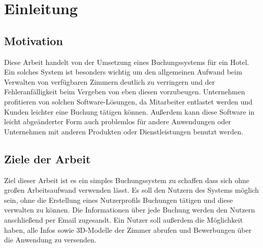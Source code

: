 \chapter{Einleitung}
\section{Motivation}
Diese Arbeit handelt von der Umsetzung eines Buchungssystems für ein Hotel. Ein solches System ist besonders wichtig um den allgemeinen Aufwand beim Verwalten von verfügbaren Zimmern deutlich zu verringern und der Fehleranfälligkeit beim Vergeben von eben diesen vorzubeugen. Unternehmen profitieren von solchen Software-Lösungen, da Mitarbeiter entlastet werden und Kunden leichter eine Buchung tätigen können. Außerdem kann diese Software in leicht abgeänderter Form auch problemlos für andere Anwendungen oder Unternehmen mit anderen Produkten oder Dienstleistungen benutzt werden.


\section{Ziele der Arbeit}
Ziel dieser Arbeit ist es ein simples Buchungssystem zu schaffen dass sich ohne großen Arbeitsaufwand verwenden lässt. Es soll den Nutzern des Systems möglich sein, ohne die Erstellung eines Nutzerprofils Buchungen tätigen und diese verwalten zu können. Die Informationen über jede Buchung werden den Nutzern anschließend per Email zugesandt. Ein Nutzer soll außerdem die Möglichkeit haben, alle Infos sowie 3D-Modelle der Zimmer abrufen und Bewerbungen über die Anwendung zu versenden.